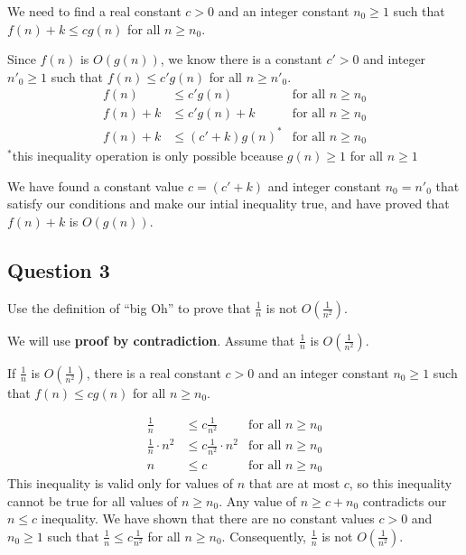 \documentclass[12pt]{article}
\begin{document}
        We need to find a real constant $c>0$ and an integer constant $n_0\ge1$ such that $f(n)+k\le cg(n)$ for all $n \ge n_0$.

        Since $f(n)$ is $O(g(n))$, we know there is a constant $c'>0$ and integer $n'_0 \ge 1$ such that $f(n) \le c'g(n)$ for all $n \ge n'_0$.
        \begin{align*}
            f(n)&\le c'g(n)&\text{for all $n\ge n_0$}\\
            f(n)+k&\le c'g(n)+k&\text{for all $n\ge n_0$}\\
            f(n)+k&\le (c'+k)g{(n)}^*&\text{for all $n\ge n_0$}
        \end{align*}
        $^*$this inequality operation is only possible bceause $g(n)\ge1$ for all $n\ge1$

        We have found a constant value $c=(c'+k)$ and integer constant $n_0=n'_0$ that satisfy our conditions and make our intial inequality true, and have proved that $f(n)+k$ is $O(g(n))$. 

    \subsection*{Question 3}
        Use the definition of ``big Oh'' to prove that $\frac{1}{n}$ is not $O(\frac{1}{n^2})$.

        We will use \textbf{proof by contradiction}. Assume that $\frac{1}{n}$ is $O(\frac{1}{n^2})$.

        If $\frac{1}{n}$ is $O(\frac{1}{n^2})$, there is a real constant $c>0$ and an integer constant $n_0\ge1$ such that $f(n)\le cg(n)$ for all $n \ge n_0$.

        \begin{align*}
            \frac{1}{n} &\le c\frac{1}{n^2}&\text{for all $n\ge n_0$}\\
            \frac{1}{n} \cdot n^2 &\le c\frac{1}{n^2}\cdot n^2&\text{for all $n\ge n_0$}\\
            n &\le c&\text{for all $n\ge n_0$}
        \end{align*}
        This inequality is valid only for values of $n$ that are at most $c$, so this inequality cannot be true for all values of $n \ge n_0$. Any value of $n \ge c + n_0$ contradicts our $n \le c$ inequality. We have shown that there are no constant values $c > 0$ and $n_0\ge 1$ such that $\frac{1}{n} \le c\frac{1}{n^2}$ for all $n\ge n_0$. Consequently, $\frac{1}{n}$ is not $O(\frac{1}{n^2})$.

    \pagebreak
\end{document}
